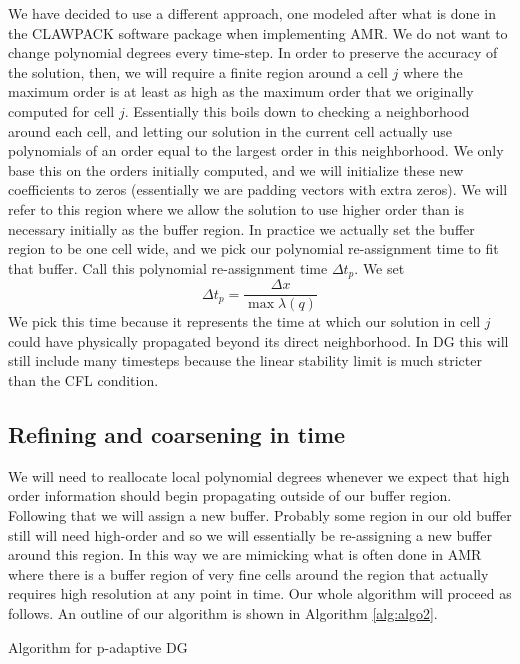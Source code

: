 \documentclass[10]{amsart}
\begin{document}
We have decided to use a different approach, one modeled after what is done in the CLAWPACK software package
when implementing AMR. We do not want to change polynomial degrees every time-step. In order to preserve the accuracy
of the solution, then, we will require a finite region around a cell $j$ where the maximum order is at least
as high as the maximum order that we originally computed for cell $j$.
Essentially this boils down to checking a neighborhood around each cell, and letting our solution in the current
cell actually use polynomials of an order equal to the largest order in this neighborhood. We only base
this on the orders initially computed, and we will initialize these new coefficients to zeros (essentially we are padding
vectors with extra zeros). We will refer to this region where
we allow the solution to use higher order than is necessary initially as the buffer region. In practice we actually
set the buffer region to be one cell wide, and we pick our polynomial re-assignment time to fit that buffer.
Call this polynomial re-assignment time  $\Delta t_p$. We set 
$$\Delta t_p=\frac{\Delta x }{\max \lambda(q)}$$
We pick this time because it represents the time at which our solution in cell $j$ could have physically propagated
beyond its direct neighborhood. 
In DG this will still include many timesteps because the linear stability limit is much stricter than the CFL condition.
\subsection{Refining and coarsening in time}
We will need to reallocate local polynomial degrees whenever we expect that high order information
 should begin propagating outside of our buffer region. Following that we will assign a new buffer.
Probably some region in our old buffer still will need high-order and so we will essentially be re-assigning a new
buffer around this region. In this way we are mimicking what is often done in AMR where there is a buffer region of
very fine cells around the region that actually requires high resolution at any point in time\cite{berger1998adaptive}.
Our whole algorithm will proceed as follows. An outline of our algorithm is shown in Algorithm \ref{alg:algo2}.
\begin{algorithm}
\caption{Algorithm for p-adaptive DG}
\begin{algorithmic}[1]
\EndFor
\EndWhile
{}
\EndFor
{}
\EndWhile

\end{algorithmic}\label{alg:algo2}
\end{algorithm}
\end{document}
